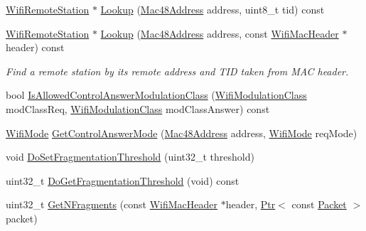 \begin{DoxyCompactItemize}
\item 
\hyperlink{structns3_1_1WifiRemoteStation}{Wifi\+Remote\+Station} $\ast$ \hyperlink{classns3_1_1WifiRemoteStationManager_a30e6f16aff4b23cec95e3086faad7983}{Lookup} (\hyperlink{classns3_1_1Mac48Address}{Mac48\+Address} address, uint8\+\_\+t tid) const 
\item 
\hyperlink{structns3_1_1WifiRemoteStation}{Wifi\+Remote\+Station} $\ast$ \hyperlink{classns3_1_1WifiRemoteStationManager_a77a1d5f91746b497f197d95b3e6c14a7}{Lookup} (\hyperlink{classns3_1_1Mac48Address}{Mac48\+Address} address, const \hyperlink{classns3_1_1WifiMacHeader}{Wifi\+Mac\+Header} $\ast$header) const 
\begin{DoxyCompactList}\small\item\em Find a remote station by its remote address and T\+ID taken from M\+AC header. \end{DoxyCompactList}\item 
bool \hyperlink{classns3_1_1WifiRemoteStationManager_a209bd05c4a1f589c7045ff1dfbe5eff2}{Is\+Allowed\+Control\+Answer\+Modulation\+Class} (\hyperlink{namespacens3_aa999e1221606a2b21b1eb33c2007c217}{Wifi\+Modulation\+Class} mod\+Class\+Req, \hyperlink{namespacens3_aa999e1221606a2b21b1eb33c2007c217}{Wifi\+Modulation\+Class} mod\+Class\+Answer) const 
\item 
\hyperlink{classns3_1_1WifiMode}{Wifi\+Mode} \hyperlink{classns3_1_1WifiRemoteStationManager_aa39d276e0171076b7ebc98b5cb8b0947}{Get\+Control\+Answer\+Mode} (\hyperlink{classns3_1_1Mac48Address}{Mac48\+Address} address, \hyperlink{classns3_1_1WifiMode}{Wifi\+Mode} req\+Mode)
\item 
void \hyperlink{classns3_1_1WifiRemoteStationManager_a2ec6b0ce2ce5df839bfc7f2a2895a6f2}{Do\+Set\+Fragmentation\+Threshold} (uint32\+\_\+t threshold)
\item 
uint32\+\_\+t \hyperlink{classns3_1_1WifiRemoteStationManager_adc62f6f62cbcd9b67913eeb775d3e554}{Do\+Get\+Fragmentation\+Threshold} (void) const 
\item 
uint32\+\_\+t \hyperlink{classns3_1_1WifiRemoteStationManager_ad4066ed9b850369a473d3d93c871bb07}{Get\+N\+Fragments} (const \hyperlink{classns3_1_1WifiMacHeader}{Wifi\+Mac\+Header} $\ast$header, \hyperlink{classns3_1_1Ptr}{Ptr}$<$ const \hyperlink{classns3_1_1Packet}{Packet} $>$ packet)
\end{DoxyCompactItemize}
